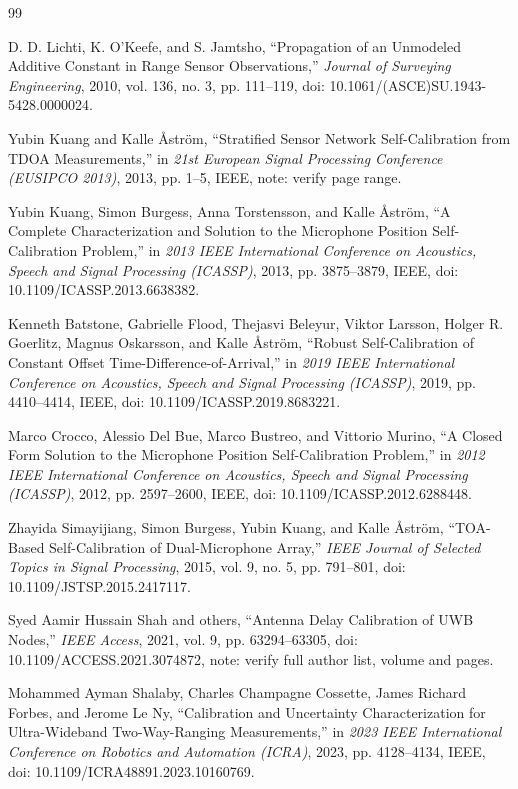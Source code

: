 \begin{thebibliography}{99}

D. D. Lichti, K. O'Keefe, and S. Jamtsho, ``Propagation of an Unmodeled Additive Constant in Range Sensor Observations,'' \emph{Journal of Surveying Engineering}, 2010, vol. 136, no. 3, pp. 111--119, doi: 10.1061/(ASCE)SU.1943-5428.0000024.

Yubin Kuang and Kalle {\AA}str{\"o}m, ``Stratified Sensor Network Self-Calibration from TDOA Measurements,'' in \emph{21st European Signal Processing Conference (EUSIPCO 2013)}, 2013, pp. 1--5, IEEE, note: verify page range.

Yubin Kuang, Simon Burgess, Anna Torstensson, and Kalle {\AA}str{\"o}m, ``A Complete Characterization and Solution to the Microphone Position Self-Calibration Problem,'' in \emph{2013 IEEE International Conference on Acoustics, Speech and Signal Processing (ICASSP)}, 2013, pp. 3875--3879, IEEE, doi: 10.1109/ICASSP.2013.6638382.

Kenneth Batstone, Gabrielle Flood, Thejasvi Beleyur, Viktor Larsson, Holger R. Goerlitz, Magnus Oskarsson, and Kalle {\AA}str{\"o}m, ``Robust Self-Calibration of Constant Offset Time-Difference-of-Arrival,'' in \emph{2019 IEEE International Conference on Acoustics, Speech and Signal Processing (ICASSP)}, 2019, pp. 4410--4414, IEEE, doi: 10.1109/ICASSP.2019.8683221.

Marco Crocco, Alessio Del Bue, Marco Bustreo, and Vittorio Murino, ``A Closed Form Solution to the Microphone Position Self-Calibration Problem,'' in \emph{2012 IEEE International Conference on Acoustics, Speech and Signal Processing (ICASSP)}, 2012, pp. 2597--2600, IEEE, doi: 10.1109/ICASSP.2012.6288448.

Zhayida Simayijiang, Simon Burgess, Yubin Kuang, and Kalle {\AA}str{\"o}m, ``TOA-Based Self-Calibration of Dual-Microphone Array,'' \emph{IEEE Journal of Selected Topics in Signal Processing}, 2015, vol. 9, no. 5, pp. 791--801, doi: 10.1109/JSTSP.2015.2417117.

Syed Aamir Hussain Shah and others, ``Antenna Delay Calibration of UWB Nodes,'' \emph{IEEE Access}, 2021, vol. 9, pp. 63294--63305, doi: 10.1109/ACCESS.2021.3074872, note: verify full author list, volume and pages.

Mohammed Ayman Shalaby, Charles Champagne Cossette, James Richard Forbes, and Jerome Le Ny, ``Calibration and Uncertainty Characterization for Ultra-Wideband Two-Way-Ranging Measurements,'' in \emph{2023 IEEE International Conference on Robotics and Automation (ICRA)}, 2023, pp. 4128--4134, IEEE, doi: 10.1109/ICRA48891.2023.10160769.


\end{thebibliography}
